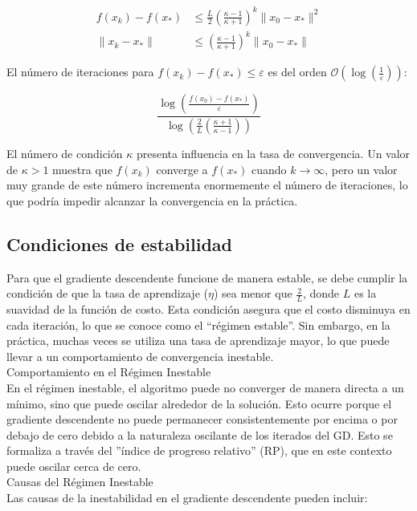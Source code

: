 \documentclass[conference]{IEEEtran}
\begin{document}
\begin{align*}
f(x_{k}) - f(x_{*}) &\leq \frac{L}{2} \left( \frac{\kappa - 1}{\kappa + 1} \right)^{k} \|x_{0} - x_{*}\|^{2} \tag{2.15} \\
\|x_{k} - x_{*}\| &\leq \left( \frac{\kappa - 1}{\kappa + 1} \right)^{k} \|x_{0} - x_{*}\|
\end{align*}

El número de iteraciones para \( f(x_k) - f(x_*) \leq \varepsilon \) es del orden \( \mathcal{O}\left(\log\left(\frac{1}{\varepsilon}\right)\right) \):

\[
\frac{\log\left(\frac{f(x_0) - f(x_*)}{\varepsilon}\right)}{\log\left(\frac{2}{L}\left(\frac{\kappa + 1}{\kappa - 1}\right)\right)}
\]

El número de condición \( \kappa \) presenta influencia en la tasa de convergencia. Un valor de \( \kappa > 1 \) muestra que \( f(x_k) \) converge a \( f(x_*) \) cuando \( k \to \infty \), pero un valor muy grande de este número incrementa enormemente el número de iteraciones, lo que podría impedir alcanzar la convergencia en la práctica.

\subsection{Condiciones de estabilidad}
Para que el gradiente descendente funcione de manera estable, se debe cumplir la condición de que la tasa de aprendizaje ($\eta$) sea menor que $\frac{2}{L}$, donde $L$ es la suavidad de la función de costo. Esta condición asegura que el costo disminuya en cada iteración, lo que se conoce como el ``régimen estable''. Sin embargo, en la práctica, muchas veces se utiliza una tasa de aprendizaje mayor, lo que puede llevar a un comportamiento de convergencia inestable. \\

Comportamiento en el Régimen Inestable\\
En el régimen inestable, el algoritmo puede no converger de manera directa a un mínimo, sino que puede oscilar alrededor de la solución. Esto ocurre porque el gradiente descendente no puede permanecer consistentemente por encima o por debajo de cero debido a la naturaleza oscilante de los iterados del GD. Esto se formaliza a través del ''índice de progreso relativo'' (RP), que en este contexto puede oscilar cerca de cero.\\

Causas del Régimen Inestable\\
Las causas de la inestabilidad en el gradiente descendente pueden incluir:
\end{document}

